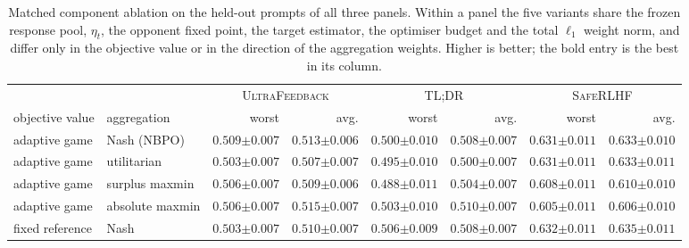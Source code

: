 \documentclass{article}
\theoremstyle{remark}
\theoremstyle{plain}
\newcommand{\NBPO}{\textsc{NBPO}}
\begin{document}
\begin{table}[t]
\centering\scriptsize
\setlength{\tabcolsep}{2.6pt}
\caption{Matched component ablation on the held-out prompts of all three panels. Within a panel the five variants share the frozen response pool, $\eta_t$, the opponent fixed point, the target estimator, the optimiser budget and the total $\ell_1$ weight norm, and differ only in the objective value or in the direction of the aggregation weights. Higher is better; the bold entry is the best in its column.}
\label{tab:component-ablation}
\begin{tabular}{llrrrrrr}
\toprule
& & \multicolumn{2}{c}{\textsc{UltraFeedback}} & \multicolumn{2}{c}{\textsc{TL;DR}} & \multicolumn{2}{c}{\textsc{SafeRLHF}}\\
\cmidrule(lr){3-4}\cmidrule(lr){5-6}\cmidrule(lr){7-8}
objective value & aggregation & worst & avg. & worst & avg. & worst & avg.\\
\midrule
adaptive game & Nash (\NBPO{}) & $\mathbf{0.509{\scriptstyle\pm0.007}}$ & $0.513{\scriptstyle\pm0.006}$ & $0.500{\scriptstyle\pm0.010}$ & $0.508{\scriptstyle\pm0.007}$ & $0.631{\scriptstyle\pm0.011}$ & $0.633{\scriptstyle\pm0.010}$\\
adaptive game & utilitarian & $0.503{\scriptstyle\pm0.007}$ & $0.507{\scriptstyle\pm0.007}$ & $0.495{\scriptstyle\pm0.010}$ & $0.500{\scriptstyle\pm0.007}$ & $0.631{\scriptstyle\pm0.011}$ & $0.633{\scriptstyle\pm0.011}$\\
adaptive game & surplus maxmin & $0.506{\scriptstyle\pm0.007}$ & $0.509{\scriptstyle\pm0.006}$ & $0.488{\scriptstyle\pm0.011}$ & $0.504{\scriptstyle\pm0.007}$ & $0.608{\scriptstyle\pm0.011}$ & $0.610{\scriptstyle\pm0.010}$\\
adaptive game & absolute maxmin & $0.506{\scriptstyle\pm0.007}$ & $\mathbf{0.515{\scriptstyle\pm0.007}}$ & $0.503{\scriptstyle\pm0.010}$ & $\mathbf{0.510{\scriptstyle\pm0.007}}$ & $0.605{\scriptstyle\pm0.011}$ & $0.606{\scriptstyle\pm0.010}$\\
fixed reference & Nash & $0.503{\scriptstyle\pm0.007}$ & $0.510{\scriptstyle\pm0.007}$ & $\mathbf{0.506{\scriptstyle\pm0.009}}$ & $0.508{\scriptstyle\pm0.007}$ & $\mathbf{0.632{\scriptstyle\pm0.011}}$ & $\mathbf{0.635{\scriptstyle\pm0.011}}$\\
\bottomrule
\end{tabular}
\end{table}
\end{document}
